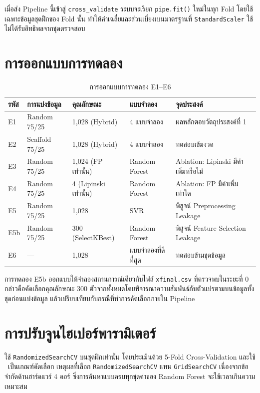 เมื่อส่ง Pipeline นี้เข้าสู่ \texttt{cross\_validate} ระบบจะเรียก \texttt{pipe.fit()} ใหม่ในทุก Fold โดยใช้เฉพาะข้อมูลชุดฝึกของ Fold นั้น ทำให้ค่าเฉลี่ยและส่วนเบี่ยงเบนมาตรฐานที่ \texttt{StandardScaler} ใช้ไม่ได้รับอิทธิพลจากชุดตรวจสอบ

\section{การออกแบบการทดลอง}

\begin{table}[H]
\centering
\caption{การออกแบบการทดลอง E1--E6}
\label{tab:experiments}
\small
\begin{tabular}{C{1.0cm} L{2.7cm} L{3.0cm} L{2.7cm} L{3.8cm}}
\toprule
\textbf{รหัส} & \textbf{การแบ่งข้อมูล} & \textbf{คุณลักษณะ} & \textbf{แบบจำลอง} & \textbf{จุดประสงค์}\\
\midrule
E1 & Random 75/25 & 1{,}028 (Hybrid) & 4 แบบจำลอง & ผลหลักตอบวัตถุประสงค์ที่ 1\\
E2 & Scaffold 75/25 & 1{,}028 (Hybrid) & 4 แบบจำลอง & ทดสอบเข้มงวด\\
E3 & Random 75/25 & 1{,}024 (FP เท่านั้น) & Random Forest & Ablation: Lipinski มีค่าเพิ่มหรือไม่\\
E4 & Random 75/25 & 4 (Lipinski เท่านั้น) & Random Forest & Ablation: FP มีค่าเพิ่มเท่าใด\\
E5 & Random 75/25 & 1{,}028 & SVR & พิสูจน์ Preprocessing Leakage\\
E5b & Random 75/25 & 300 (SelectKBest) & Random Forest & พิสูจน์ Feature Selection Leakage\\
E6 & --- & 1{,}028 & แบบจำลองที่ดีที่สุด & ทดสอบข้ามชุดข้อมูล\\
\bottomrule
\end{tabular}
\end{table}

การทดลอง E5b ออกแบบให้จำลองสถานการณ์เดียวกับไฟล์ \texttt{xfinal.csv} ที่ตรวจพบในระยะที่ 0 กล่าวคือคัดเลือกคุณลักษณะ 300 ตัวจากทั้งหมดโดยพิจารณาความสัมพันธ์กับตัวแปรตามบนข้อมูลทั้งชุดก่อนแบ่งข้อมูล แล้วเปรียบเทียบกับกรณีที่ทำการคัดเลือกภายใน Pipeline

\section{การปรับจูนไฮเปอร์พารามิเตอร์}

ใช้ \texttt{RandomizedSearchCV} บนชุดฝึกเท่านั้น โดยประเมินด้วย 5-Fold Cross-Validation และใช้ \Rsq\ เป็นเกณฑ์คัดเลือก เหตุผลที่เลือก \texttt{RandomizedSearchCV} แทน \texttt{GridSearchCV} เนื่องจากข้อจำกัดด้านฮาร์ดแวร์ 4 คอร์ ซึ่งการค้นหาแบบครบทุกชุดค่าของ Random Forest จะใช้เวลาเกินความเหมาะสม

